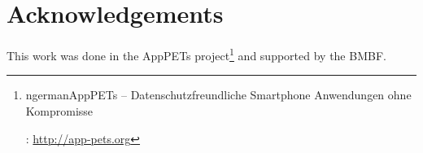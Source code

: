 \documentclass[
	parskip = half,
	headings = small,
	twocolumn = true,
	bibliography = totoc,
]{scrartcl}
\author{%
	Maximilian Blochberger\\
	\small\texttt{blochberger@informatik.uni-hamburg.de}
}
\title{\DocumentTitle}
\date{\today}
\begin{document}
	\maketitle

	

	\section*{Acknowledgements}
	This work was done in the AppPETs project\footnote{\begin{otherlanguage*}{ngerman}AppPETs – Datenschutzfreundliche Smartphone Anwendungen ohne Kompromisse\end{otherlanguage*}: \url{http://app-pets.org}} and supported by the BMBF.

	\printbibliography%
\end{document}
